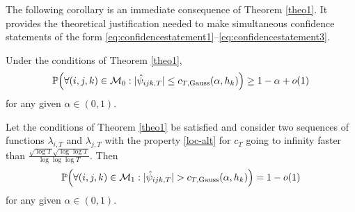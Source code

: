 \documentclass[a4paper,12pt]{article}
\numberwithin{equation}{section}
\begin{document}
The following corollary is an immediate consequence of Theorem \ref{theo1}. It provides the theoretical justification needed to make simultaneous confidence statements of the form \eqref{eq:confidencestatement1}--\eqref{eq:confidencestatement3}.


\begin{corollaryA}\label{corollary1}
Under the conditions of Theorem \ref{theo1}, 
$$ \mathbb{P}\Big( \forall (i,j,k) \in \mathcal{M}_0: |\hat{\psi}_{ijk,T}| \le c_{T,\textnormal{Gauss}}(\alpha,h_k) \Big) \ge 1 - \alpha + o(1) $$
for any given $\alpha \in (0,1)$.   
\end{corollaryA} 
\begin{corollaryA}\label{corollary2}
Let the conditions of Theorem \ref{theo1} be satisfied and consider two sequences of functions $\lambda_{i, T}$ and $\lambda_{j, T}$ with the property \eqref{loc-alt} for $c_T$ going to infinity faster than $\frac{\sqrt{\log T}\sqrt{\log \log T}}{\log \log \log T}$. Then 
\[ \mathbb{P}\Big( \forall (i,j,k) \in \mathcal{M}_1: |\hat{\psi}_{ijk,T}| > c_{T,\textnormal{Gauss}}(\alpha,h_k) \Big) = 1 - o(1) \]
for any given $\alpha \in (0, 1)$. 
\end{corollaryA}
\end{document}
